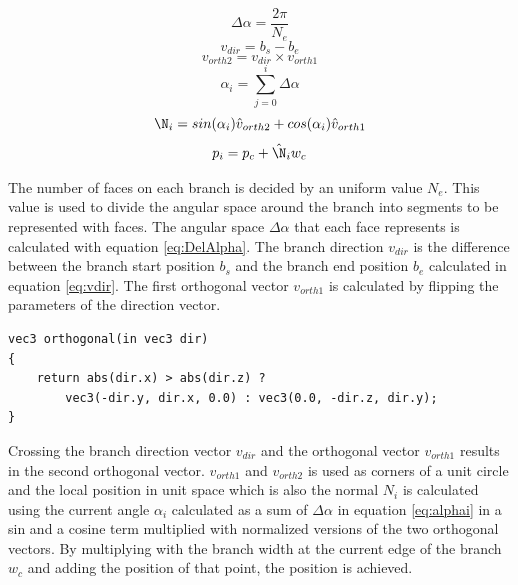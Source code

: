 \documentclass[11pt]{article} %
\begin{document}
\begin{equation}
	\label{eq:DelAlpha}
	\Delta \alpha = \frac{2 \pi}{N_{e}}
\end{equation}
\begin{equation}
	\label{eq:vdir}
	v_{dir} = b_{s} - b_{e} 
\end{equation}
\begin{equation}
	\label{eq:vcross}
	v_{orth2} = v_{dir}\times v_{orth1}
\end{equation}
\begin{equation}
	\label{eq:alphai}
	\alpha_{i} = \sum_{j = 0}^{i}\Delta \alpha
\end{equation}
\begin{equation}
	\label{eq:betai}
	\N_{i} = sin(\alpha_{i}) \hat{v}_{orth2} + cos(\alpha_{i}) \hat{v}_{orth1}
\end{equation}
\begin{equation}
	\label{eq:pi}
	p_{i}=p_{c} +  \hat{\N}_{i} w_{c}
\end{equation}

The number of faces on each branch is decided by an uniform value $N_{e}$.
This value is used to divide the angular space around the branch into segments to be represented with faces.
The angular space $ \Delta \alpha $ that each face represents is calculated with equation \ref{eq:DelAlpha}.
The branch direction $ v_{dir} $ is the difference between the branch start position $ b_{s} $
and the branch end position $ b_{e} $ calculated in equation \ref{eq:vdir}.
The first orthogonal vector $ v_{orth1} $ is calculated by flipping the parameters of the direction vector.

\begin{lstlisting}
vec3 orthogonal(in vec3 dir)
{
	return abs(dir.x) > abs(dir.z) ? 
		vec3(-dir.y, dir.x, 0.0) : vec3(0.0, -dir.z, dir.y);
}
\end{lstlisting}

Crossing the branch direction vector $ v_{dir} $ and the orthogonal vector $ v_{orth1} $ results in the second orthogonal vector.
$ v_{orth1} $ and $ v_{orth2} $ is used as corners of a unit circle and the local position in unit space which is also the normal $ N_{i} $ is calculated using the current angle $ \alpha_{i} $ calculated as a sum of $ \Delta \alpha $ in equation \ref{eq:alphai} in a sin and a cosine term multiplied with normalized versions of the two orthogonal vectors.
By multiplying with the branch width at the current edge of the branch $ w_{c} $ and adding the position of that point, the position is achieved.
\end{document}
